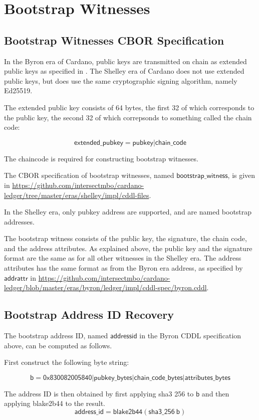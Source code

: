 \section{Bootstrap Witnesses}
\label{sec:bootstrap-witnesses}

\subsection{Bootstrap Witnesses CBOR Specification}

In the Byron era of Cardano, public keys are transmitted
on chain as extended public keys as specified in \cite{bip32}.
The Shelley era of Cardano does not use extended public keys,
but does use the same cryptographic signing algorithm,
namely Ed25519.

The extended public key consists of 64 bytes,
the first 32 of which corresponds to the public key,
the second 32 of which correpsonds to something called the chain code:

$$\mathsf{extended\_pubkey} = \mathsf{pubkey}|\mathsf{chain\_code}$$

The chaincode is required for constructing bootstrap witnesses.

The CBOR specification of bootstrap witnesses,
named $\mathsf{bootstrap\_witness}$,
is given in
\url{https://github.com/intersectmbo/cardano-ledger/tree/master/eras/shelley/impl/cddl-files}.

In the Shelley era, only pubkey address are supported,
and are named bootstrap addresses.

The bootstrap witness consists of the public key, the signature,
the chain code, and the address attributes.
As explained above, the public key and the signature format
are the same as for all other witnesses in the Shelley era.
The address attributes has the same format as from the Byron era address,
as specified by $\mathsf{addrattr}$ in
\url{https://github.com/intersectmbo/cardano-ledger/blob/master/eras/byron/ledger/impl/cddl-spec/byron.cddl}.


\subsection{Bootstrap Address ID Recovery}

The bootstrap address ID, named $\mathsf{addressid}$ in the Byron CDDL
specification above, can be computed as follows.

First construct the following byte string:

$$\mathsf{b} =
  \mathsf{0x830082005840}
  | \mathsf{pubkey\_bytes}
  | \mathsf{chain\_code\_bytes}
  | \mathsf{attributes\_bytes}
$$

The address ID is then obtained by first applying
sha3 256 to $\mathsf{b}$ and then applying blake2b44 to the result.
$$\mathsf{address\_id} =
  \mathsf{blake2b44}(\mathsf{sha3\_256}~\mathsf{b})
$$
